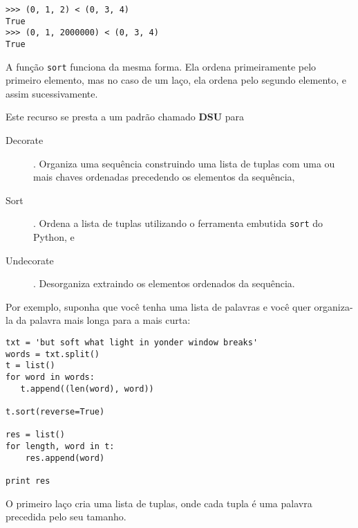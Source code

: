\beforeverb
\begin{verbatim}
>>> (0, 1, 2) < (0, 3, 4)
True
>>> (0, 1, 2000000) < (0, 3, 4)
True
\end{verbatim}
\afterverb
%
A função {\tt sort} funciona da mesma forma. Ela ordena
primeiramente pelo primeiro elemento, mas no caso de um laço,
ela ordena pelo segundo elemento, e assim sucessivamente.

Este recurso se presta a um padrão chamado {\bf DSU} para

\begin{description}

\item[Decorate]. Organiza uma sequência construindo uma lista de tuplas
com uma ou mais chaves ordenadas precedendo os elementos da sequência,

\item[Sort]. Ordena a lista de tuplas utilizando o ferramenta embutida 
{\tt sort} do Python, e

\item[Undecorate]. Desorganiza extraindo os elementos ordenados da sequência.

\end{description}

\label{DSU}

Por exemplo, suponha que você tenha uma lista de palavras e você
quer organiza-la da palavra mais longa para a mais curta:

\beforeverb
\begin{verbatim}
txt = 'but soft what light in yonder window breaks'
words = txt.split()
t = list()
for word in words:
   t.append((len(word), word))

t.sort(reverse=True)

res = list()
for length, word in t:
    res.append(word)

print res
\end{verbatim}
\afterverb
%
O primeiro laço cria uma lista de tuplas, onde cada tupla é
uma palavra precedida pelo seu tamanho.

